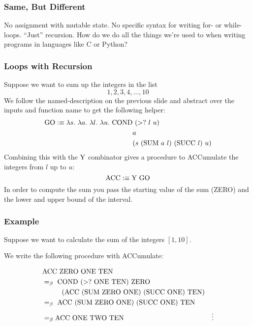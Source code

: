 \documentclass{beamer}
\begin{document}
\begin{frame}
	\frametitle{Same, But Different}

	No assignment with mutable state. No specific syntax for writing for- or while-loops. ``Just'' recursion. How do we do all the things we're used to when writing programs in languages like C or Python? 

	\vspace{5cm}
	
\end{frame}

\begin{frame}
	\frametitle{Loops with Recursion}

	Suppose we want to sum up the integers in the list 
	$$1, 2, 3, 4, ..., 10$$
	We follow the named-description on the previous slide and abstract over the inputs and function name to get the following helper: 
	\begin{align*}
		\GO :\equiv \lambda s. \ \lambda a. \ \lambda l. \ \lambda u. \ \COND & \ (>? \ l \ u) \\
		& a \\ 
		&(s \ (\SUM \ a \ l) \ (\SUCC \ l) \ u)
	\end{align*}
	Combining this with the $\text{Y}$ combinator gives a procedure to ACCumulate the integers from $l$ up to $u$: 
	$$\text{ACC} :\equiv \text{Y} \ \text{GO}$$
	In order to compute the sum you pass the starting value of the sum (ZERO) and the lower and upper bound of the interval.

\end{frame}

\begin{frame}
	\frametitle{Example}
	
	Suppose we want to calculate the sum of the integers $[1,10]$. 
	
	We write the following procedure with ACCumulate: 

	\begin{align*}
		&\ACC \ \ZERO \ \ONE \ \text{TEN} \\
		&\beq \ \COND \ (>? \ \ONE \ \text{TEN}) \ \ZERO \\ 
		&\hspace{1cm} (\ACC \ (\SUM \ \ZERO \ \ONE) \ (\SUCC \ \ONE) \ \text{TEN}) \\
		&\beq \ \ACC \ (\SUM \ \ZERO \ \ONE) \ (\SUCC \ \ONE) \ \text{TEN} \\
		&\beq \ACC \ \ONE \ \TWO \ \text{TEN}
		&\vdots
	\end{align*}


\end{frame}
\end{document}
